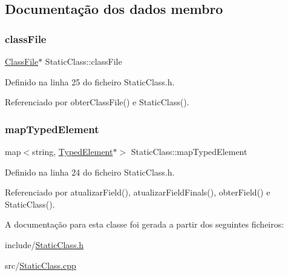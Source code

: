 \subsection{Documentação dos dados membro}
\mbox{\label{classStaticClass_a809f1e4dabb3db229a18423f0d0b4a95}} 
\subsubsection{\texorpdfstring{class\+File}{classFile}}
{\footnotesize\ttfamily \hyperlink{classClassFile}{Class\+File}$\ast$ Static\+Class\+::class\+File\hspace{0.3cm}{\ttfamily [private]}}



Definido na linha 25 do ficheiro Static\+Class.\+h.



Referenciado por obter\+Class\+File() e Static\+Class().

\mbox{\label{classStaticClass_a472067db1f02a84897348f6a2ca68636}} 
\subsubsection{\texorpdfstring{map\+Typed\+Element}{mapTypedElement}}
{\footnotesize\ttfamily map$<$string, \hyperlink{BasicTypes_8h_a97b332303b1262282599e6ede0637b82}{Typed\+Element}$\ast$$>$ Static\+Class\+::map\+Typed\+Element\hspace{0.3cm}{\ttfamily [private]}}



Definido na linha 24 do ficheiro Static\+Class.\+h.



Referenciado por atualizar\+Field(), atualizar\+Field\+Finals(), obter\+Field() e Static\+Class().



A documentação para esta classe foi gerada a partir dos seguintes ficheiros\+:\begin{DoxyCompactItemize}
\item 
include/\hyperlink{StaticClass_8h}{Static\+Class.\+h}\item 
src/\hyperlink{StaticClass_8cpp}{Static\+Class.\+cpp}\end{DoxyCompactItemize}
